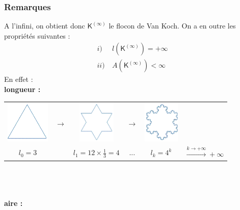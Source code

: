\documentclass[a4paper,10pt]{report}
\begin{document}
\subsubsection{Remarques}
A l'infini, on obtient donc $\mathsf{K^{(\infty)}}$ le flocon de Van Koch. On a en outre les propriétés suivantes :\\
\begin{align*}
   i) \ & l(\mathsf{K^{(\infty)}})=+\infty \\
   ii) \ & \mathit{A}(\mathsf{K^{(\infty)}})<\infty
\end{align*}
En effet :\\
\textbf{longueur :}\\
\begin{tabular}{cccccc}
\includegraphics[height=2cm]{koch_l0.png} & $\rightarrow$ & \includegraphics[height=2cm]{koch_l1.png} & $\rightarrow$ & \includegraphics[height=2cm]{koch_k.png} &\\
$l_0=3$ & & $l_1=12\times \frac{1}{3}=4$ & ... & $l_k=4^k$ & $\overset{k \rightarrow +\infty}{\longrightarrow} +\infty $\\
\end{tabular} \\ \\ \\
\textbf{aire :}\\
\end{document}

